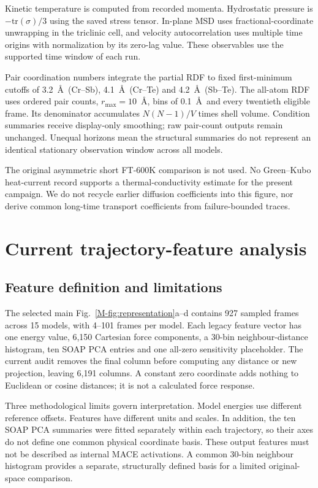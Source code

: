 \documentclass[pdflatex,sn-mathphys-num]{sn-jnl}
\begin{document}
Kinetic temperature is computed from recorded momenta. Hydrostatic pressure is $-\mathrm{tr}(\sigma)/3$ using the saved stress tensor. In-plane MSD uses fractional-coordinate unwrapping in the triclinic cell, and velocity autocorrelation uses multiple time origins with normalization by its zero-lag value. These observables use the supported time window of each run.

Pair coordination numbers integrate the partial RDF to fixed first-minimum cutoffs of 3.2~\AA\ (Cr--Sb), 4.1~\AA\ (Cr--Te) and 4.2~\AA\ (Sb--Te). The all-atom RDF uses ordered pair counts, $r_{\max}=10$~\AA, bins of 0.1~\AA\ and every twentieth eligible frame. Its denominator accumulates $N(N-1)/V$ times shell volume. Condition summaries receive display-only smoothing; raw pair-count outputs remain unchanged. Unequal horizons mean the structural summaries do not represent an identical stationary observation window across all models.

The original asymmetric short FT-600K comparison is not used. No Green--Kubo heat-current record supports a thermal-conductivity estimate for the present campaign. We do not recycle earlier diffusion coefficients into this figure, nor derive common long-time transport coefficients from failure-bounded traces.
\section{Current trajectory-feature analysis}\label{sec:representation}
\subsection{Feature definition and limitations}
The selected main Fig.~\ref{M-fig:representation}a--d contains 927 sampled frames across 15 models, with 4--101 frames per model. Each legacy feature vector has one energy value, 6,150 Cartesian force components, a 30-bin neighbour-distance histogram, ten SOAP PCA entries and one all-zero sensitivity placeholder. The current audit removes the final column before computing any distance or new projection, leaving 6,191 columns. A constant zero coordinate adds nothing to Euclidean or cosine distances; it is not a calculated force response.

Three methodological limits govern interpretation. Model energies use different reference offsets. Features have different units and scales. In addition, the ten SOAP PCA summaries were fitted separately within each trajectory, so their axes do not define one common physical coordinate basis. These output features must not be described as internal MACE activations. A common 30-bin neighbour histogram provides a separate, structurally defined basis for a limited original-space comparison.
\end{document}
